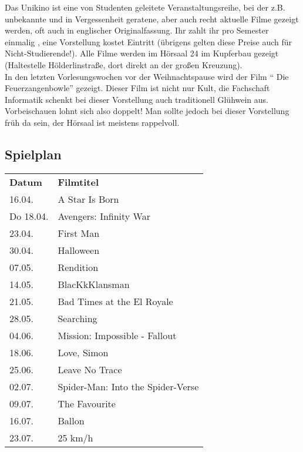 Das Unikino ist eine von Studenten geleitete Veranstaltungsreihe, bei der z.B. unbekannte und in Vergessenheit geratene, aber auch recht aktuelle Filme gezeigt werden, oft auch in englischer Originalfassung. Ihr zahlt ihr pro Semester einmalig , eine Vorstellung kostet  Eintritt (übrigens gelten diese Preise auch für Nicht-Studierende!). Alle Filme werden im Hörsaal 24 im Kupferbau gezeigt (Haltestelle Hölderlinstraße, dort direkt an der großen Kreuzung).\\
In den letzten Vorlesungswochen vor der Weihnachtspause wird der Film "` Die Feu\-er\-zang\-en\-bow\-le"' gezeigt. Dieser Film ist nicht nur Kult, die Fachschaft Informatik schenkt bei dieser Vorstellung auch traditionell Glühwein aus. Vorbeischauen lohnt sich also doppelt! Man sollte jedoch bei dieser Vorstellung früh da sein, der Hörsaal ist meistens rappelvoll.

\subsection*{Spielplan}
\renewcommand{\arraystretch}{1.2}
\begin{tabular}{l l}
\textbf{Datum} & \textbf{Filmtitel}     			\\
16.04.			& A Star Is Born 					\\
Do 18.04. 		& Avengers: Infinity War 			\\
23.04. 			& First Man 						\\
30.04.			& Halloween 						\\
07.05. 			& Rendition		 					\\
14.05. 			& BlacKkKlansman 					\\
21.05. 			& Bad Times at the El Royale 		\\
28.05. 			& Searching 						\\
04.06. 			& Mission: Impossible - Fallout 	\\
18.06. 			& Love, Simon 						\\
25.06. 			& Leave No Trace 					\\
02.07. 			& Spider-Man: Into the Spider-Verse \\
09.07. 			& The Favourite 					\\
16.07. 			& Ballon 							\\
23.07. 			& 25 km/h 							\\
\end{tabular}

